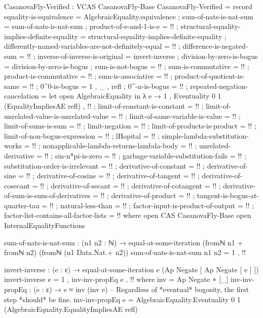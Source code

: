 \documentclass{report}
\begin{document}
\begin{code}
CasanovaFly-Verified : VCAS CasanovaFly-Base
CasanovaFly-Verified = record
  { equality-is-equivalence = AlgebraicEquality.equivalence
  ; sum-of-nats-is-nat-sum = sum-of-nats-is-nat-sum
  ; product-of-e-and-1-is-e = {!!}
  ; structural-equality-implies-definite-equality =
    structural-equality-implies-definite-equality
  ; differently-named-variables-are-not-definitely-equal = {!!}
  ; difference-is-negated-sum = {!!}
  ; inverse-of-inverse-is-original = invert-inverse
  ; division-by-zero-is-bogus = division-by-zero-is-bogus
  ; sum-is-not-bogus = {!!}
  ; sum-is-commutative = {!!}
  ; product-is-commutative = {!!}
  ; sum-is-associative = {!!}
  ; product-of-quotient-is-same = {!!}
  ; 0^0-is-bogus = 1 , _ , refl
  ; 0^-n-is-bogus = {!!}
  ; repeated-negation-cancelation =
    let open AlgebraicEquality in
    λ e → 1
        , Eventuality 0 1 (EqualityImpliesAE refl)
        , {!!}
  ; limit-of-constant-is-constant = {!!}
  ; limit-of-unrelated-value-is-unrelated-value = {!!}
  ; limit-of-same-variable-is-value = {!!}
  ; limit-of-sums-is-sum = {!!}
  ; limit-negation = {!!}
  ; limit-of-products-is-product = {!!}
  ; limit-of-non-bogus-expression = {!!}
  ; lHopital = {!!}
  ; simple-lambda-substitution-works = {!!}
  ; nonapplicable-lambda-returns-lambda-body = {!!}
  ; unrelated-derivative = {!!}
  ; sin-n*pi-is-zero = {!!}
  ; garbage-variable-substitution-fails = {!!}
  ; substitution-order-is-irrelevant = {!!}
  ; derivative-of-constant = {!!}
  ; derivative-of-sine = {!!}
  ; derivative-of-cosine = {!!}
  ; derivative-of-tangent = {!!}
  ; derivative-of-cosecant = {!!}
  ; derivative-of-secant = {!!}
  ; derivative-of-cotangent = {!!}
  ; derivative-of-sum-is-sum-of-derivatives = {!!}
  ; derivative-of-product = {!!}
  ; tangent-is-bogus-at-quarter-tau = {!!}
  ; natural-less-than = {!!}
  ; factor-input-is-product-of-output = {!!}
  ; factor-list-contains-all-factor-lists = {!!}
  }
  where
  open CAS CasanovaFly-Base
  open InternalEqualityFunctions

  sum-of-nats-is-nat-sum :
    (n1 n2 : ℕ) →
    equal-at-some-iteration (fromℕ n1 + fromℕ n2) (fromℕ (n1 Data.Nat.+ n2))
  sum-of-nats-is-nat-sum n1 n2 = 1 , {!!}

  invert-inverse : (e : ε) → equal-at-some-iteration e (Ap Negate [ Ap Negate [ e ] ])
  invert-inverse e = 1 , inv-inv-propEq e , {!!}
    where
    inv = Ap Negate ∘ [_]
    inv-inv-propEq :
      (e : ε) →
      e ≈ inv (inv e)
    -- Regardless of *eventual* bogosity, the first step *should* be fine.
    inv-inv-propEq e =
      AlgebraicEquality.Eventuality 0 1 (AlgebraicEquality.EqualityImpliesAE refl)


\end{code}
\end{document}
